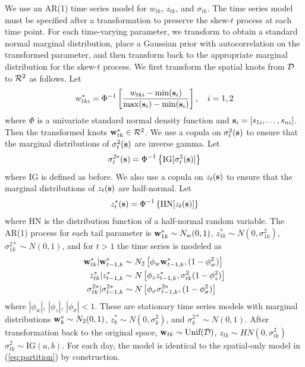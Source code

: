 \documentclass[useAMS,usenatbib,referee]{biom}
\begin{document}
We use an AR(1) time series model for $w_{tk}$, $z_{tk}$, and $\sigma_{tk}$.
The time series model must be specified after a transformation to preserve the skew-$t$ process at each time point.
For each time-varying parameter, we transform to obtain a standard normal marginal distribution, place a Gaussian prior with autocorrelation on the transformed parameter, and then transform back to the appropriate marginal distribution for the skew-$t$ process.
We first transform the spatial knots from $\calD$ to $\calR^2$ as follows.
Let
\begin{align}
  w^*_{tki} = \Phi^{-1}\left[ \frac{ w_{tki} - \min(\mbox{\bf s}_i)}{ \max(\mbox{\bf s}_i) - \min(\mbox{\bf s}_i) } \right], \quad i = 1, 2
\end{align}
where $\Phi$ is a univariate standard normal density function and $\mbox{\bf s}_i = [s_{1i}, \ldots, s_{ni}]$.
Then the transformed knots $\bw^*_{tk} \in \calR^2$.
We use a copula on $\sigma^2_t(\mbox{\bf s})$ to ensure that the marginal distributions of $\sigma^2_t(\mbox{\bf s})$ are inverse gamma.
Let
\begin{align}
  \sigma^{2*}_t(\mbox{\bf s}) =\Phi^{-1}\left\{ \text{IG}[\sigma^2_t(\mbox{\bf s})] \right\}
\end{align}
where IG is defined as before.
We also use a copula on $z_{t}(\mbox{\bf s})$ to ensure that the marginal distributions of $z_t(\mbox{\bf s})$ are half-normal.
Let
\begin{align}
  z^*_t(\mbox{\bf s}) = \Phi^{-1}\left\{ \text{HN}[z_t(\mbox{\bf s})] \right\}
\end{align}
where HN is the distribution function of a half-normal random variable.
The AR(1) process for each tail parameter is $\mbox{\bf w}^*_{1k} \sim N_w(0, 1)$, $z^*_{1k} \sim N(0, \sigma^2_{1k})$, $\sigma^{2*}_{1k} \sim N(0, 1)$, and for $t > 1$ the time series is modeled as
\begin{align}
  \mbox{\bf w}^*_{tk} | \mbox{\bf w}^*_{t-1, k} &\sim N_2\left[\phi_w \mbox{\bf w}^*_{t-1, k}, (1 - \phi_w^2) \right] \\
  z^*_{tk} | z^*_{t-1, k} &\sim N \left[\phi_z z^*_{t-1, k}, \sigma^2_{tk} (1 - \phi_z^2)\right] \\
  \sigma^{2*}_{tk} | \sigma^{2*}_{t-1, k} &\sim N \left[\phi_\sigma \sigma^{2*}_{t-1, k}, (1 - \phi_\sigma^2) \right]
\end{align}
where $|\phi_w|$, $|\phi_z|$, $|\phi_\sigma| < 1$.
These are stationary time series models with marginal distributions \hbox{$\mbox{\bf w}^*_{k} \sim N_2(0, 1)$}, \hbox{$z^*_{k} \sim N(0, \sigma^2_{k})$}, and \hbox{$\sigma^{2*}_{k} \sim N(0, 1)$}.
After transformation back to the original space, $\bw_{tk} \sim \text{Unif}(\calD)$, $z_{tk} \sim HN(0, \sigma^2_{tk})$ $\sigma^2_{tk} \sim \text{IG}(a, b)$.
For each day, the model is identical to the spatial-only model in (\ref{eq:partition}) by construction.
\end{document}
